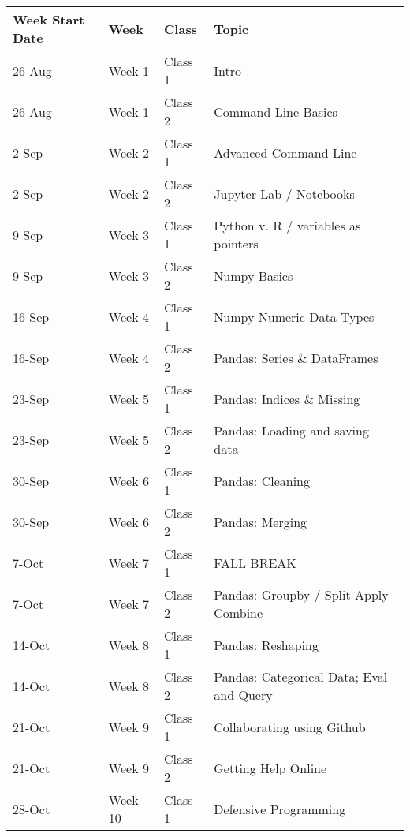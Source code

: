 \documentclass[12pt]{article}
\begin{document}
\begin{table}[]
\begin{tabular}{@{}llll@{}}
\toprule
Week Start Date    & Week    & Class   & Topic                                    \\ \midrule
26-Aug             & Week 1  & Class 1 & Intro                                    \\
26-Aug             & Week 1  & Class 2 & Command Line Basics                      \\
2-Sep              & Week 2  & Class 1 & Advanced Command Line                    \\
2-Sep              & Week 2  & Class 2 & Jupyter Lab / Notebooks                  \\
9-Sep              & Week 3  & Class 1 & Python v. R / variables as pointers      \\
9-Sep              & Week 3  & Class 2 & Numpy Basics                             \\
16-Sep             & Week 4  & Class 1 & Numpy Numeric Data Types                 \\
16-Sep             & Week 4  & Class 2 & Pandas: Series \& DataFrames             \\
23-Sep             & Week 5  & Class 1 & Pandas: Indices \& Missing               \\
23-Sep             & Week 5  & Class 2 & Pandas: Loading and saving data          \\
30-Sep             & Week 6  & Class 1 & Pandas: Cleaning                         \\
30-Sep             & Week 6  & Class 2 & Pandas: Merging                          \\
7-Oct              & Week 7  & Class 1 & FALL BREAK                               \\
7-Oct              & Week 7  & Class 2 & Pandas: Groupby / Split Apply Combine    \\
14-Oct             & Week 8  & Class 1 & Pandas: Reshaping                        \\
14-Oct             & Week 8  & Class 2 & Pandas: Categorical Data; Eval and Query \\
21-Oct             & Week 9  & Class 1 & Collaborating using Github               \\
21-Oct             & Week 9  & Class 2 & Getting Help Online                      \\
28-Oct             & Week 10 & Class 1 & Defensive Programming                    \\

\end{tabular}
\end{table}
\end{document}

